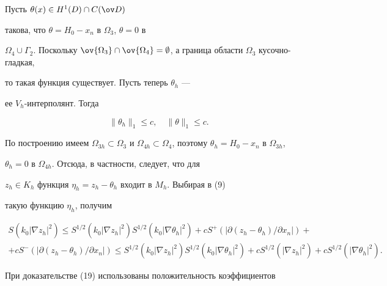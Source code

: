 \begin{pf}


Пусть $\theta(x) \in H^1 (D) \cap C(\ov D)$


такова, что $\theta = H_0 - x_n$ в $\Omega_3$, $\theta = 0$ в


$\Omega_4 \cup \Gamma_2$. Поскольку $\ov {\Omega_3} \cap


\ov {\Omega_4} = \emptyset$, а граница области $\Omega_3$ кусочно-гладкая,


то такая функция существует. Пусть теперь $\theta_h$ ---


ее $V_h$-интерполянт. Тогда


\begin{equation}\label{18}


\| \theta_h \|_1 \leq c, \quad \| \theta \|_1 \leq c.


\end{equation}





По построению имеем $\Omega_{3h} \subset \Omega_3$ и $\Omega_{4h} \subset


\Omega_4$, поэтому $\theta_h = H_0 - x_n$ в $\Omega_{3h}$,


$\theta_h = 0$ в $\Omega_{4h}$. Отсюда, в частности, следует, что для


$z_h \in K_h$ функция $\eta_h = z_h -\theta_h$ входит в $M_h$. Выбирая в (9)


такую функцию $\eta_h$, получим


\begin{multline}\label{19}


S(k_0 |\nabla z_h|^2) \leq S^{1/2}(k_0 |\nabla z_h|^2)


S^{1/2}(k_0 |\nabla \theta_h|^2) + 


c S^+(|\partial (z_h - \theta_h)/\partial x_n|) + \\


%


+ c S^-(|\partial (z_h - \theta_h)/\partial x_n|)


\leq S^{1/2}(k_0 |\nabla z_h|^2) S^{1/2}(k_0 |\nabla \theta_h|^2)


+ c S^{1/2}(|\nabla z_h|^2) + c S^{1/2}(|\nabla \theta_h|^2).


\end{multline}





При доказательстве (19) использованы положительность коэффициентов



\end{pf}
